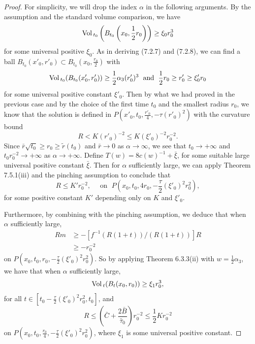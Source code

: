 \begin{proof}
For simplicity, we will drop the index $\alpha$ in the following
arguments. By the assumption and the standard volume comparison,
we have
$$
{\rm Vol}\,_{t_0}\left(B_{t_0}\left(x_0,\frac{1}{2}r_0\right)\right)\geq \xi_0r^3_0
$$
for some universal positive $\xi_0$. As in deriving (7.2.7) and
(7.2.8), we can find a ball $B_{t_0}(x'_0,r'_0)\subset
B_{t_0}(x_0,\frac{r_0}{2})$ with
$$
{\rm Vol}\,_{t_0}(B_{t_0}(x'_0,r'_0)) \geq \frac{1}{2}\alpha_3(r'_0)^3\;
\mbox{ and }\; \frac{1}{2}r_0\geq r'_0\geq \xi'_0r_0
$$
for some universal positive constant $\xi'_0$. Then by what we had
proved in the previous case and by the choice of the first time
$t_0$ and the smallest radius $r_0$, we know that the solution is
defined in $P(x'_0,t_0,\frac{r'_0}{4},-\tau (r'_0)^2)$ with the
curvature bound $$R<K(r'_0)^{-2}\leq K(\xi'_0)^{-2}r^{-2}_0.$$
Since $\bar{r}\sqrt{t_0}\geq r_0\geq \widetilde{r}(t_0)$ and
$\bar{r}\rightarrow 0$ as $\alpha\rightarrow\infty$, we see that
$t_0\rightarrow +\infty$ and $t_0r^{-2}_0\rightarrow+\infty$ as
$\alpha\rightarrow+\infty$. Define $T(w) = 8c(w)^{-1} +
\bar{\xi}$, for some suitable large universal positive constant
$\bar{\xi}$. Then for $\alpha$ sufficiently large, we can apply
Theorem 7.5.1(iii) and the pinching assumption to conclude that
\begin{equation} R\leq K'r^{-2}_0,\quad \mbox{ on }\;
P\left(x_0,t_0,4r_0,-\frac{\tau}{2}(\xi'_0)^2r^2_0\right), %
\end{equation} for some positive constant $K'$ depending only on $K$ and
$\xi'_0$.

Furthermore, by combining with the pinching assumption, we deduce
that when $\alpha$ sufficiently large,
\begin{align}
Rm &  \geq -[f^{-1}(R(1+t))/(R(1+t))]R\\
&  \geq -r^{-2}_0 \nonumber
\end{align}  %
on $P(x_0,t_0,r_0,-\frac{\tau}{2}(\xi'_0)^2r^2_0)$.  So by
applying Theorem 6.3.3(ii) with $w=\frac{1}{2}\alpha_3$, we have
that when $\alpha$ sufficiently large, \begin{equation}
\Vol_t(B_t(x_0,r_0)) \geq \xi_1 r^3_0,  %
\end{equation} for all $ t \in [t_0 -\frac{\tau}{2}(\xi'_0)^2r^2_0, t_0]$,
and \begin{equation} R\leq\left(\bar{C}+\frac{2\bar{B}}{\bar{\tau}_0}\right)r^{-2}_0\leq
\frac{1}{2}Kr^{-2}_0 %
\end{equation} on $P(x_0,t_0,\frac{r_0}{4},-\frac{\tau}{2}(\xi'_0)^2r^2_0)$,
where $\xi_1$ is some universal positive constant.


\end{proof}
